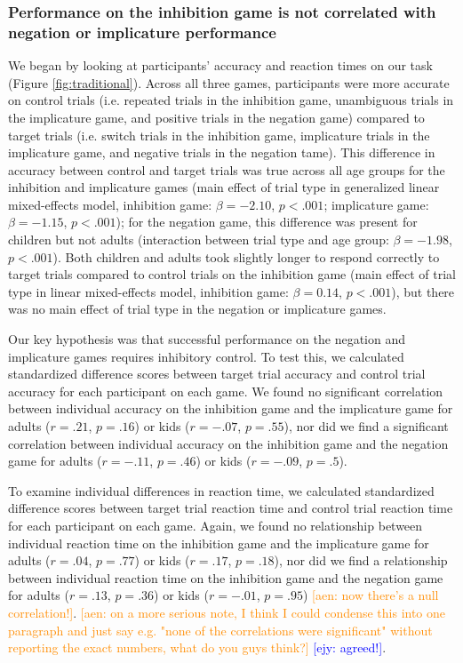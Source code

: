 \documentclass[10pt,letterpaper]{article}
\newcommand{\ejy}[1]{\textcolor{Blue}{[ejy: #1]}}
\newcommand{\aen}[1]{\textcolor{DarkOrange}{[aen: #1]}}
\begin{document}
\subsubsection{Performance on the inhibition game is not correlated with negation or implicature performance}

We began by looking at participants' accuracy and reaction times on our task (Figure \ref{fig:traditional}).  Across all three games, participants were more accurate on control trials (i.e. repeated trials in the inhibition game, unambiguous trials in the implicature game, and positive trials in the negation game) compared to target trials (i.e. switch trials in the inhibition game, implicature trials in the implicature game, and negative trials in the negation tame).  This difference in accuracy between control and target trials was true across all age groups for the inhibition and implicature games (main effect of trial type in generalized linear mixed-effects model, inhibition game: $\beta = -2.10$, $p< .001$; implicature game: $\beta = -1.15$, $p< .001$); for the negation game, this difference was present for children but not adults (interaction between trial type and age group: $\beta = -1.98$, $p< .001$).  Both children and adults took slightly longer to respond correctly to target trials compared to control trials on the inhibition game (main effect of trial type in linear mixed-effects model, inhibition game: $\beta = 0.14$, $p< .001$), but there was no main effect of trial type in the negation or implicature games.  

Our key hypothesis was that successful performance on the negation and implicature games requires inhibitory control.  To test this, we calculated standardized difference scores between target trial accuracy and control trial accuracy for each participant on each game.  We found no significant correlation between individual accuracy on the inhibition game and the implicature game for adults ($r = .21$, $p = .16$) or kids  ($r = -.07$, $p = .55$), nor did we find a significant correlation between individual accuracy on the inhibition game and the negation game for adults  ($r = -.11$, $p = .46$) or kids  ($r = -.09$, $p = .5$).  

To examine individual differences in reaction time, we calculated standardized difference scores between target trial reaction time and control trial reaction time for each participant on each game.  Again, we found no relationship between individual reaction time on the inhibition game and the implicature game for adults  ($r = .04$, $p = .77$) or kids  ($r = .17$, $p = .18$), nor did we find a relationship between individual reaction time on the inhibition game and the negation game for adults  ($r = .13$, $p = .36$) or kids ($r = -.01$, $p = .95$) \aen{now there's a null correlation!}.  \aen{on a more serious note, I think I could condense this into one paragraph and just say e.g. "none of the correlations were significant" without reporting the exact numbers, what do you guys think?} \ejy{agreed!}.
\end{document}
